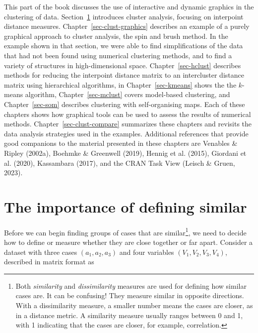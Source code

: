 \documentclass[
  letterpaper,
]{krantz}
\begin{document}
This part of the book discusses the use of interactive and dynamic
graphics in the clustering of data. Section~\ref{sec-clust-bg}
introduces cluster analysis, focusing on interpoint distance measures.
Chapter~\ref{sec-clust-graphics} describes an example of a purely
graphical approach to cluster analysis, the spin and brush method. In
the example shown in that section, we were able to find simplifications
of the data that had not been found using numerical clustering methods,
and to find a variety of structures in high-dimensional space.
Chapter~\ref{sec-hclust} describes methods for reducing the interpoint
distance matrix to an intercluster distance matrix using hierarchical
algorithms, in Chapter~\ref{sec-kmeans} shows the the \(k\)-means
algorithm, Chapter~\ref{sec-mclust} covers model-based clustering, and
Chapter~\ref{sec-som} describes clustering with self-organising maps.
Each of these chapters shows how graphical tools can be used to assess
the results of numerical methods. Chapter~\ref{sec-clust-compare}
summarizes these chapters and revisits the data analysis strategies used
in the examples. Additional references that provide good companions to
the material presented in these chapters are Venables \& Ripley (2002a),
Boehmke \& Greenwell (2019), Hennig et al. (2015), Giordani et al.
(2020), Kassambara (2017), and the CRAN Task View (Leisch \& Gruen,
2023).

\section{The importance of defining similar}\label{sec-clust-bg}

Before we can begin finding groups of cases that are similar\footnote{Both
  \emph{similarity} and \emph{dissimilarity} measures are used for
  defining how similar cases are. It can be confusing! They measure
  similar in opposite directions. With a dissimilarity measure, a
  smaller number means the cases are closer, as in a distance metric. A
  similarity measure usually ranges between 0 and 1, with 1 indicating
  that the cases are closer, for example, correlation.}, we need to
decide how to define or measure whether they are close together or far
apart. Consider a dataset with three cases \((a_1, a_2, a_3)\) and four
variables \((V_1, V_2, V_3, V_4)\), described in matrix format as
\end{document}
